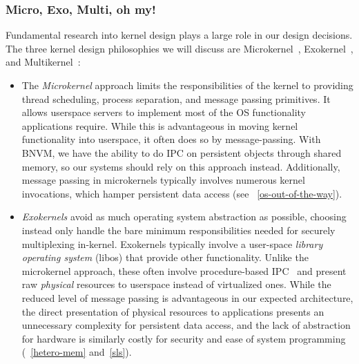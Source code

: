 {    \subsubsection{Micro, Exo, Multi, oh my!}

    Fundamental research into kernel design plays a large role in our design decisions. The three kernel
    design philosophies we will discuss are Microkernel~\cite{accetta:usenix86s},
    Exokernel~\cite{engler:sosp95}, and Multikernel~\cite{baumann:sosp09}:
    \begin{itemize}
        \item The \emph{Microkernel} approach limits the responsibilities of the kernel to providing
              thread scheduling, process separation, and message passing primitives. It allows userspace
              servers to implement most of the OS functionality applications require. While this is
              advantageous in moving kernel functionality into userspace, it often does so by
              message-passing. With BNVM, we have the ability to do IPC on persistent objects through
              shared memory, so our systems should rely on this approach instead. Additionally, message
              passing in microkernels typically involves numerous kernel invocations, which hamper
              persistent data access (see \observation~\ref{os-out-of-the-way}).

        \item \emph{Exokernels} avoid as much operating system abstraction as possible, choosing instead
              only handle the bare minimum responsibilities needed for securely multiplexing in-kernel.
              Exokernels typically involve a user-space \textit{library operating system} (libos) that
              provide other functionality. Unlike the microkernel approach, these often involve
              procedure-based IPC~\cite{lauer:osr79,engler:sosp95} and present raw \emph{physical}
              resources to userspace instead of virtualized ones. While the reduced level of message
              passing is advantageous in our expected architecture, the direct presentation of physical resources
              to applications presents an unnecessary complexity for persistent data access, and the lack
              of abstraction for hardware is similarly costly for security and ease of system programming
              (\observations~\ref{hetero-mem} and~\ref{sls}).


\end{itemize}}
